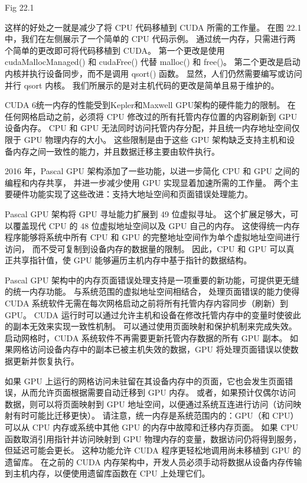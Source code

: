 {\color{red} Fig 22.1}

这样的好处之一就是减少了将 CPU 代码移植到 CUDA 所需的工作量。 在图 22.1 中，我们在左侧展示了一个简单的 CPU 代码示例。 
通过统一内存，只需进行两个简单的更改即可将代码移植到 CUDA。 
第一个更改是使用 cudaMallocManaged() 和 cudaFree() 代替 malloc() 和 free()。 
第二个更改是启动内核并执行设备同步，而不是调用 qsort() 函数。 
显然，人们仍然需要编写或访问并行 qsort 内核。 我们所展示的是对主机代码的更改是简单且易于维护的。

CUDA 6统一内存的性能受到Kepler和Maxwell GPU架构的硬件能力的限制。 
在任何网格启动之前，必须将 CPU 修改过的所有托管内存位置的内容刷新到 GPU 设备内存。 
CPU 和 GPU 无法同时访问托管内存分配，并且统一内存地址空间仅限于 GPU 物理内存的大小。 
这些限制是由于这些 GPU 架构缺乏支持主机和设备内存之间一致性的能力，并且数据迁移主要由软件执行。

2016 年，Pascal GPU 架构添加了一些功能，以进一步简化 CPU 和 GPU 之间的编程和内存共享，
并进一步减少使用 GPU 实现显着加速所需的工作量。 两个主要硬件功能实现了这些改进：支持大地址空间和页面错误处理能力。

Pascal GPU 架构将 GPU 寻址能力扩展到 49 位虚拟寻址。 
这个扩展足够大，可以覆盖现代 CPU 的 48 位虚拟地址空间以及 GPU 自己的内存。 
这使得统一内存程序能够将系统中所有 CPU 和 GPU 的完整地址空间作为单个虚拟地址空间进行访问，
而不受可复制到设备内存的数据量的限制。 因此，CPU 和 GPU 可以真正共享指针值，使 GPU 能够遍历主机内存中基于指针的数据结构。

Pascal GPU 架构中的内存页面错误处理支持是一项重要的新功能，可提供更无缝的统一内存功能。 
与系统范围的虚拟地址空间相结合，
处理页面错误的能力使得 CUDA 系统软件无需在每次网格启动之前将所有托管内存内容同步（刷新）到 GPU。 
CUDA 运行时可以通过允许主机和设备在修改托管内存中的变量时使彼此的副本无效来实现一致性机制。 
可以通过使用页面映射和保护机制来完成失效。 启动网格时，CUDA 系统软件不再需要更新托管内存数据的所有 GPU 副本。 
如果网格访问设备内存中的副本已被主机失效的数据，GPU 将处理页面错误以使数据更新并恢复执行。

如果 GPU 上运行的网格访问未驻留在其设备内存中的页面，它也会发生页面错误，从而允许页面根据需要自动迁移到 GPU 内存。 
或者，如果预计仅偶尔访问数据，则可以将页面映射到 GPU 地址空间，以便通过系统互连进行访问（访问映射有时可能比迁移更快）。 
请注意，统一内存是系统范围内的：GPU（和 CPU）可以从 CPU 内存或系统中其他 GPU 的内存中故障和迁移内存页面。 
如果 CPU 函数取消引用指针并访问映射到 GPU 物理内存的变量，数据访问仍将得到服务，但延迟可能会更长。 
这种功能允许 CUDA 程序更轻松地调用尚未移植到 GPU 的遗留库。 
在之前的 CUDA 内存架构中，开发人员必须手动将数据从设备内存传输到主机内存，以便使用遗留库函数在 CPU 上处理它们。

